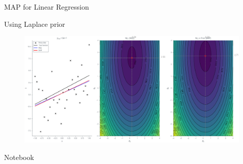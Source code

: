 \documentclass{beamer}
\begin{document}
\begin{section}{MAP for Linear Regression}
    \begin{frame}{Using Laplace prior}
        \begin{figure}
            \centerline{\includegraphics[scale = 0.40]{../figures/map/linreg_mle_map_laplace.pdf}}
        \end{figure}
        Notebook
    \end{frame}
\end{section}
\end{document}
